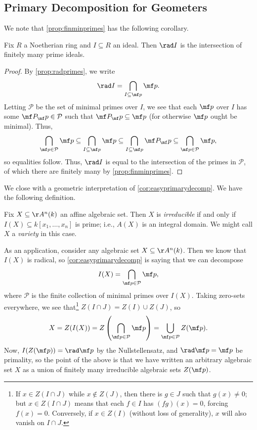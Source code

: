 \subsection{Primary Decomposition for Geometers}
We note that \autoref{prop:finminprimes} has the following corollary.
\begin{corollary} \label{cor:easyprimarydecomp}
	Fix $R$ a Noetherian ring and $I\subseteq R$ an ideal. Then $\rad I$ is the intersection of finitely many prime ideals.
\end{corollary}
\begin{proof}
	By \autoref{prop:radprimes}, we write
	\[\rad I=\bigcap_{I\subseteq\mf p}\mf p.\]
	Letting $\mathcal P$ be the set of minimal primes over $I$, we see that each $\mf p$ over $I$ has some $\mf P_\mf p\in\mathcal P$ such that $\mf P_\mf p\subseteq\mf p$ (for otherwise $\mf p$ ought be minimal). Thus,
	\[\bigcap_{\mf p\in\mathcal P}\mf p\subseteq\bigcap_{I\subseteq\mf p}\mf p\subseteq\bigcap_{I\subseteq\mf p}\mf P_\mf p\subseteq\bigcap_{\mf p\in\mathcal P}\mf p,\]
	so equalities follow. Thus, $\rad I$ is equal to the intersection of the primes in $\mathcal P$, of which there are finitely many by \autoref{prop:finminprimes}.
\end{proof}
We close with a geometric interpretation of \autoref{cor:easyprimarydecomp}. We have the following definition.
\begin{defi}[Irreducible]
	Fix $X\subseteq\AA^n(k)$ an affine algebraic set. Then $X$ is \textit{irreducible} if and only if $I(X)\subseteq k[x_1,\ldots,x_n]$ is prime; i.e., $A(X)$ is an integral domain. We might call $X$ a \textit{variety} in this case.
\end{defi}
As an application, consider any algebraic set $X\subseteq\AA^n(k)$. Then we know that $I(X)$ is radical, so \autoref{cor:easyprimarydecomp} is saying that we can decompose
\[I(X)=\bigcap_{\mf p\in\mathcal P}\mf p,\]
where $\mathcal P$ is the finite collection of minimal primes over $I(X)$. Taking zero-sets everywhere, we see that\footnote{If $x\in Z(I\cap J)$ while $x\notin Z(J)$, then there is $g\in J$ such that $g(x)\ne0$; but $x\in Z(I\cap J)$ means that each $f\in I$ has $(fg)(x)=0$, forcing $f(x)=0$. Conversely, if $x\in Z(I)$ (without loss of generality), $x$ will also vanish on $I\cap J$.} $Z(I\cap J)=Z(I)\cup Z(J)$, so
\[X=Z(I(X))=Z\left(\bigcap_{\mf p\in\mathcal P}\mf p\right)=\bigcup_{\mf p\in\mathcal P}Z(\mf p).\]
Now, $I(Z(\mf p))=\rad\mf p$ by the Nullstellensatz, and $\rad\mf p=\mf p$ be primality, so the point of the above is that we have written an arbitrary algebraic set $X$ as a union of finitely many irreducible algebraic sets $Z(\mf p)$.
